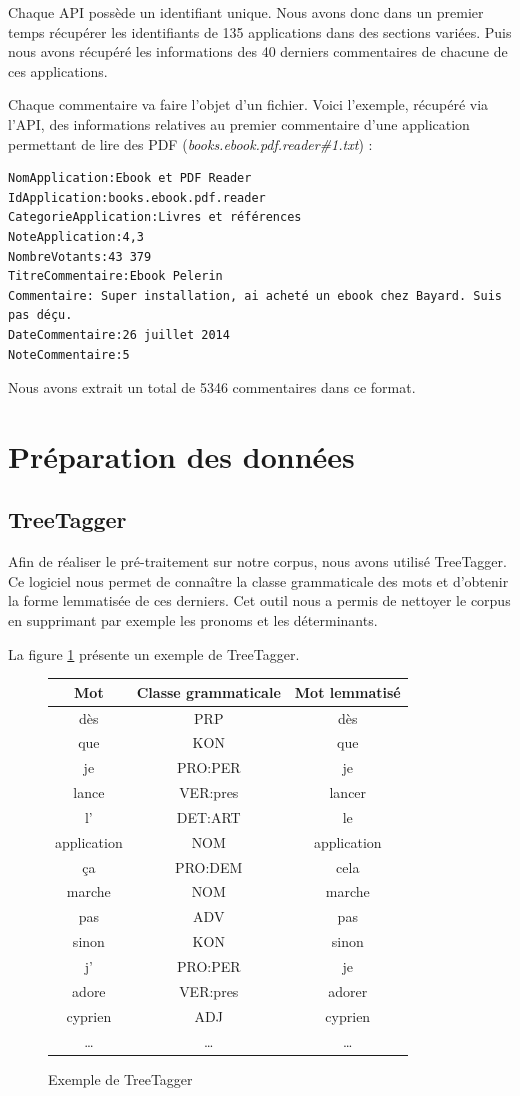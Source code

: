 \documentclass[a4paper, 11pt]{article}
\begin{document}
Chaque API possède un identifiant unique. Nous avons donc dans un premier temps récupérer les identifiants de 135 applications dans des sections variées. Puis nous avons récupéré les informations des 40 derniers commentaires de chacune de ces applications.

Chaque commentaire va faire l'objet d'un fichier. Voici l'exemple, récupéré via l'API, des informations relatives au premier commentaire d'une application permettant de lire des PDF (\textit{books.ebook.pdf.reader\#1.txt}) :

\begin{verbatim}
NomApplication:Ebook et PDF Reader
IdApplication:books.ebook.pdf.reader
CategorieApplication:Livres et références
NoteApplication:4,3
NombreVotants:43 379
TitreCommentaire:Ebook Pelerin
Commentaire: Super installation, ai acheté un ebook chez Bayard. Suis pas déçu.
DateCommentaire:26 juillet 2014
NoteCommentaire:5
\end{verbatim}


Nous avons extrait un total de 5346 commentaires dans ce format.

\section{Préparation des données}

\subsection{TreeTagger}
Afin de réaliser le pré-traitement sur notre corpus, nous avons utilisé TreeTagger. Ce logiciel nous permet de connaître la classe grammaticale des mots et d’obtenir la forme lemmatisée de ces derniers. Cet outil nous a permis de nettoyer le corpus en supprimant par exemple les pronoms et les déterminants.

La figure \ref{treetagger} présente un exemple de TreeTagger.
\begin{figure}[!h]
\centering
 \begin{tabular}{|c|c|c|}
 \hline
	Mot&Classe grammaticale&Mot lemmatisé\\
 \hline
    dès&PRP&dès\\
    que&KON&que\\
    je&PRO:PER&je\\
    lance&VER:pres&lancer\\
    l'&DET:ART&le\\
    application&NOM&application\\
    ça&PRO:DEM&cela\\
    marche&NOM&marche\\
    pas&ADV&pas\\
    sinon&KON&sinon\\
    j'&PRO:PER&je\\
    adore&VER:pres&adorer\\
    cyprien&ADJ&cyprien\\
    \dots&\dots&\dots\\
 \hline
 \end{tabular}
 \caption{Exemple de TreeTagger}
\label{treetagger}
\end{figure}
\end{document}
